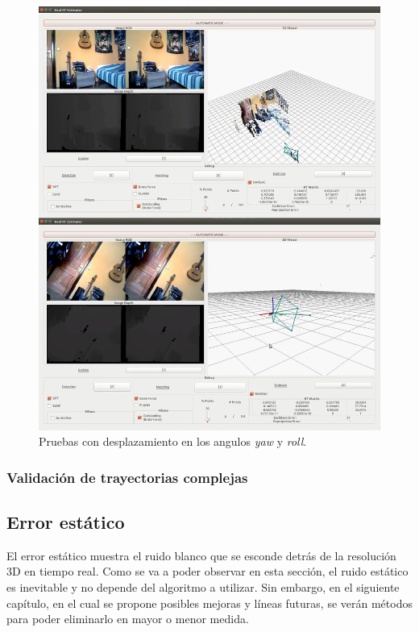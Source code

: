 \begin{figure}[th]
\centering
\includegraphics[scale=0.3]{Figures/tests/yaw-roll.png}
\decoRule
\caption[Pruebas con desplazamiento en los angulos \textit{yaw} y \textit{roll}]{Pruebas con desplazamiento en los angulos \textit{yaw} y \textit{roll}.}
\label{fig:yaw-roll}
\end{figure}

\subsubsection{Validación de trayectorias complejas}

\subsection{Error estático}

El error estático muestra el ruido blanco que se esconde detrás de la resolución 3D en tiempo real. Como se va a poder observar en esta sección, el ruido estático es inevitable y no depende del algoritmo a utilizar. Sin embargo, en el siguiente capítulo, en el cual se propone posibles mejoras y líneas futuras, se verán métodos para poder eliminarlo en mayor o menor medida.


